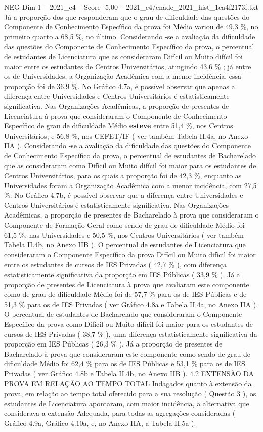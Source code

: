\begin{textsample}{NEG Dim 1 – 2021\_c4 – Score -5.00 – 2021\_c4/enade\_2021\_hist\_1ca4f2173f.txt}
Já a proporção dos que responderam que o grau de dificuldade das questões do Componente de Conhecimento Específico da prova foi Médio variou de 49,3 \%, no primeiro quarto a 68,5 \%, no último.
Considerando -se a avaliação da dificuldade das questões do Componente de Conhecimento Específico da prova, o percentual de estudantes de Licenciatura que as consideraram Difícil ou Muito difícil foi maior entre os estudantes de Centros Universitários, atingindo 43,6 \% ; já entre os de Universidades, a Organização Acadêmica com a menor incidência, essa proporção foi de 36,9 \%.
No Gráfico 4.7a, é possível observar que apenas a diferença entre Universidades e Centros Universitários é estatisticamente significativa.
Nas Organizações Acadêmicas, a proporção de presentes de Licenciatura à prova que consideraram o Componente de Conhecimento Específico de grau de dificuldade Médio \textbf{esteve} entre 51,4 \%, nos Centros Universitários, e 56,8 \%, nos CEFET/IF ( ver também Tabela II.4a, no Anexo IIA ).
Considerando -se a avaliação da dificuldade das questões do Componente de Conhecimento Específico da prova, o percentual de estudantes de Bacharelado que as consideraram como Difícil ou Muito difícil foi maior para os estudantes de Centros Universitários, para os quais a proporção foi de 42,3 \%, enquanto as Universidades foram a Organização Acadêmica com a menor incidência, com 27,5 \%.
No Gráfico 4.7b, é possível observar que a diferença entre Universidades e Centros Universitários é estatisticamente significativa.
Nas Organizações Acadêmicas, a proporção de presentes de Bacharelado à prova que consideraram o Componente de Formação Geral como sendo de grau de dificuldade Médio foi 61,5 \%, nas Universidades e 50,5 \%, nos Centros Universitários ( ver também Tabela II.4b, no Anexo IIB ).
O percentual de estudantes de Licenciatura que consideraram o Componente Específico da prova Difícil ou Muito difícil foi maior entre os estudantes de cursos de IES Privadas ( 42,7 \% ), com diferença estatisticamente significativa da proporção em IES Públicas ( 33,9 \% ).
Já a proporção de presentes de Licenciatura à prova que avaliaram este componente como de grau de dificuldade Médio foi de 57,7 \% para os de IES Públicas e de 51,3 \% para os de IES Privadas ( ver Gráfico 4.8a e Tabela II.4a, no Anexo IIA ).
O percentual de estudantes de Bacharelado que consideraram o Componente Específico da prova como Difícil ou Muito difícil foi maior para os estudantes de cursos de IES Privadas ( 38,7 \% ), uma diferença estatisticamente significativa da proporção em IES Públicas ( 26,3 \% ).
Já a proporção de presentes de Bacharelado à prova que consideraram este componente como sendo de grau de dificuldade Médio foi 62,4 \% para os de IES Públicas e 53,1 \% para os de IES Privadas ( ver Gráfico 4.8b e Tabela II.4b, no Anexo IIB ). 4.2 EXTENSÃO DA PROVA EM RELAÇÃO AO TEMPO TOTAL Indagados quanto à extensão da prova, em relação ao tempo total oferecido para a sua resolução ( Questão 3 ), os estudantes de Licenciatura apontaram, com maior incidência, a alternativa que considerava a extensão Adequada, para todas as agregações consideradas ( Gráfico 4.9a, Gráfico 4.10a, e, no Anexo IIA, a Tabela II.5a ).

\end{textsample}
